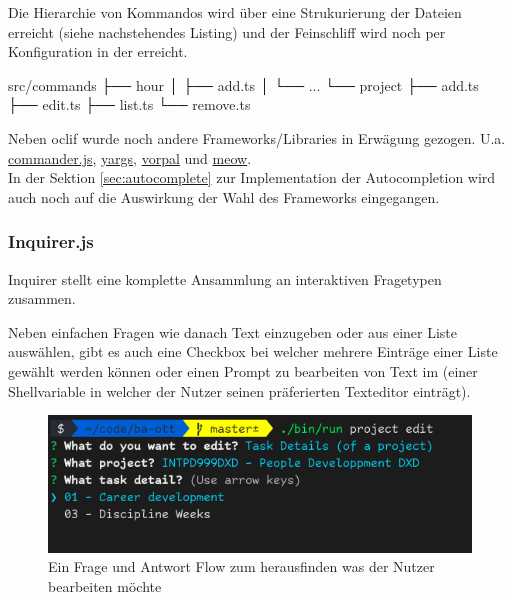 \documentclass[oneside,bibliography=totocnumbered,BCOR=5mm]{scrbook}
\newenvironment{code}{\captionsetup{type=listing, skip=0pt}}{}
\begin{document}
Die Hierarchie von Kommandos wird über eine Strukurierung der Dateien erreicht (siehe nachstehendes Listing) und der Feinschliff wird noch per Konfiguration in der  erreicht.

\begin{code}
  \begin{shellcode}
 src/commands
 ├── hour
 │   ├── add.ts
 │   └── ...
 └── project
     ├── add.ts
     ├── edit.ts
     ├── list.ts
     └── remove.ts
  \end{shellcode}
  \medskip
\end{code}

\medskip

Neben oclif wurde noch andere Frameworks/Libraries in Erwägung gezogen. U.a.
\href{https://github.com/tj/commander.js}{commander.js},
\href{https://github.com/yargs/yargs}{yargs},
\href{https://github.com/dthree/vorpal}{vorpal} und
\href{https://github.com/sindresorhus/meow}{meow}.
\\
In der Sektion \ref{sec:autocomplete} zur Implementation der Autocompletion wird
auch noch auf die Auswirkung der Wahl des Frameworks eingegangen.

\subsubsection{Inquirer.js}

Inquirer stellt eine komplette Ansammlung an interaktiven %
Fragetypen zusammen.

Neben einfachen Fragen wie danach Text einzugeben oder aus einer Liste
auswählen, gibt es auch eine Checkbox bei welcher mehrere Einträge einer
Liste gewählt werden können oder einen Prompt zu bearbeiten von Text im
 (einer Shellvariable in welcher der Nutzer seinen
präferierten Texteditor einträgt).

\begin{figure}
  \centering
  \includegraphics[scale=0.5]{inquirer-example.png}
  \caption{Ein Frage und Antwort Flow zum herausfinden was der Nutzer bearbeiten möchte}
  \label{fig:inquirer-example}
\end{figure}
\end{document}

